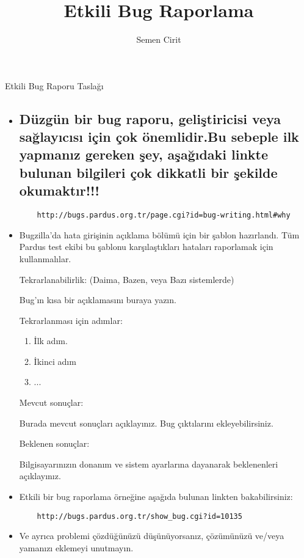\documentclass[a4paper,10pt]{article}
\title{Etkili Bug Raporlama}
\author{Semen Cirit}
\begin{document}
\maketitle

Etkili Bug Raporu Taslağı

\begin{itemize}
 
  	\item \subsection*{Düzgün bir  bug raporu, geliştiricisi veya sağlayıcısı için çok önemlidir.Bu sebeple ilk yapmanız gereken şey, aşağıdaki linkte bulunan bilgileri çok dikkatli bir şekilde okumaktır!!!}
	\begin{verbatim} 
 	http://bugs.pardus.org.tr/page.cgi?id=bug-writing.html#why
	\end{verbatim}


  	\item Bugzilla'da hata girişinin açıklama bölümü için bir şablon hazırlandı. Tüm Pardus test ekibi bu şablonu karşılaştıkları hataları raporlamak için kullanmalılar.

   	Tekrarlanabilirlik: (Daima, Bazen, veya Bazı sistemlerde)	
   
    	Bug'ın kısa bir açıklamasını buraya yazın.
   
   	Tekrarlanması için adımlar:
   	\begin{enumerate}
    	\item İlk adım.
    	\item İkinci adım
    	\item ...
   	\end{enumerate}

	Mevcut sonuçlar:

	Burada mevcut sonuçları açıklayınız. Bug çıktılarını ekleyebilirsiniz.
	
	Beklenen sonuçlar:

	Bilgisayarınızın donanım ve sistem ayarlarına dayanarak beklenenleri açıklayınız.
	
	\item Etkili bir bug raporlama örneğine aşağıda bulunan linkten bakabilirsiniz:
	\begin{verbatim}
	http://bugs.pardus.org.tr/show_bug.cgi?id=10135
	\end{verbatim}
	\item Ve ayrıca problemi çözdüğünüzü düşünüyorsanız, çözümünüzü ve/veya yamanızı eklemeyi unutmayın.


\end{itemize}
\end{document}

